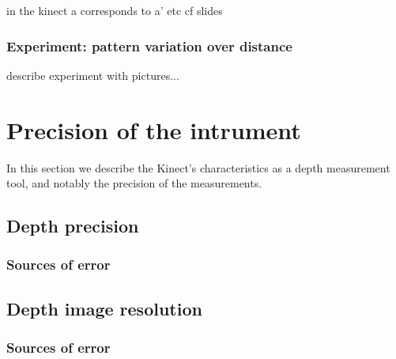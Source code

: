 
in the kinect a corresponds to a' etc
cf slides


\subsubsection{Experiment: pattern variation over distance}

describe experiment with pictures... 


\section{Precision of the intrument}
\label{precision}


In this section we describe the Kinect's characteristics as a depth measurement
tool, and notably the precision of the measurements.


\subsection{Depth precision}

\subsubsection{Sources of error}

\subsection{Depth image resolution}

\subsubsection{Sources of error}
